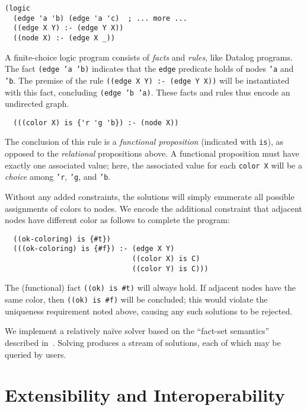 \documentclass[dvipsnames,sigplan,screen,review,anonymous,acmthm,nonacm]{acmart}
\begin{document}
\begin{verbatim}
(logic
  (edge 'a 'b) (edge 'a 'c)  ; ... more ...
  ((edge X Y) :- (edge Y X))
  ((node X) :- (edge X _))
\end{verbatim}
A finite-choice logic program consists of \emph{facts} and \emph{rules},
like Datalog programs. 
The fact \texttt{(edge 'a 'b)} indicates that the \texttt{edge} predicate
holds of nodes \texttt{'a} and \texttt{'b}.
The premise of the rule \texttt{((edge X Y) :- (edge Y X))} will be
instantiated with this fact, concluding \texttt{(edge 'b 'a)}.
These facts and rules thus encode an undirected graph.

\begin{verbatim}
  (((color X) is {'r 'g 'b}) :- (node X))
\end{verbatim}
The conclusion of this rule is a \emph{functional proposition}
(indicated with \texttt{is}), as opposed to the \emph{relational} propositions above.
A functional proposition must have exactly one associated value;
here, the associated value for each \texttt{color X} will
be a \emph{choice} among \texttt{'r}, \texttt{'g}, and \texttt{'b}.

Without any added constraints, the solutions will simply enumerate all
possible assignments of colors to nodes. We encode the additional constraint
that adjacent nodes have different color as follows to complete the program:

\begin{verbatim}
  ((ok-coloring) is {#t})
  (((ok-coloring) is {#f}) :- (edge X Y)
                              ((color X) is C)
                              ((color Y) is C)))
\end{verbatim}
The (functional) fact \texttt{((ok) is {\#t})} will always hold.
If adjacent nodes have the same color, then \texttt{((ok) is {\#f})}
will be concluded; this would violate the uniqueness requirement noted
above, causing any such solutions to be rejected.

We implement a relatively naïve solver based on the ``fact-set semantics''
described in~\cite{martens2025dusa}. Solving produces a stream of solutions,
each of which may be queried by users.

\section{Extensibility and Interoperability}
\end{document}
